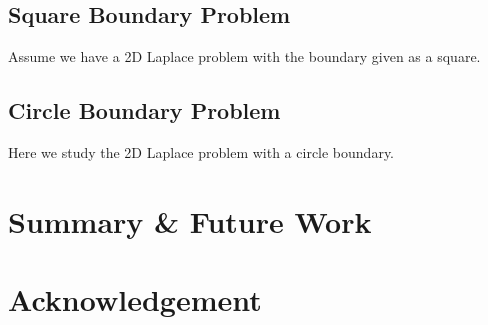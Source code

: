 \documentclass[aps, prl, reprint, groupedaddress]{revtex4-1}
\begin{document}
\subsection{Square Boundary Problem}

Assume we have a 2D Laplace problem with the boundary given as a square.

\subsection{Circle Boundary Problem}

Here we study the 2D Laplace problem with a circle boundary.

\section{Summary \& Future Work}

\section{Acknowledgement}


\end{document}
